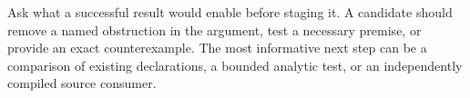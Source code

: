 Ask what a successful result would enable before staging it.
A candidate should remove a named obstruction in the argument,
test a necessary premise, or provide an exact counterexample.
The most informative next step can be a comparison of existing
declarations, a bounded analytic test, or an independently
compiled source consumer.
